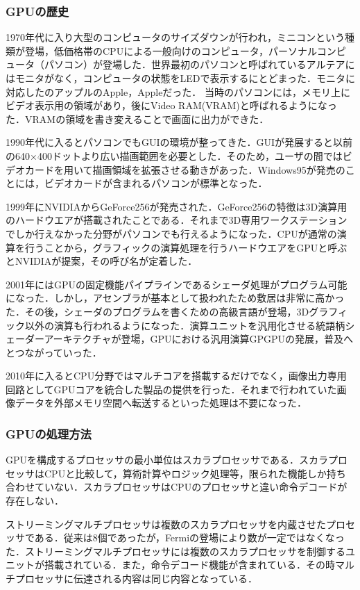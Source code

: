 \documentclass[a4j,12pt]{jsarticle}
\begin{document}
\subsubsection{GPUの歴史}
1970年代に入り大型のコンピュータのサイズダウンが行われ，ミニコンという種類が登場，低価格帯のCPUによる一般向けのコンピュータ，パーソナルコンピュータ（パソコン）が登場した．世界最初のパソコンと呼ばれているアルテアにはモニタがなく，コンピュータの状態をLEDで表示するにとどまった．モニタに対応したのアップルのApple，Appleだった．
当時のパソコンには，メモリ上にビデオ表示用の領域があり，後にVideo RAM(VRAM)と呼ばれるようになった．VRAMの領域を書き変えることで画面に出力ができた．

1990年代に入るとパソコンでもGUIの環境が整ってきた．GUIが発展すると以前の640×400ドットより広い描画範囲を必要とした．そのため，ユーザの間ではビデオカードを用いて描画領域を拡張させる動きがあった．Windows95が発売のことには，ビデオカードが含まれるパソコンが標準となった．

1999年にNVIDIAからGeForce256が発売された．GeForce256の特徴は3D演算用のハードウエアが搭載されたことである．それまで3D専用ワークステーションでしか行えなかった分野がパソコンでも行えるようになった．CPUが通常の演算を行うことから，グラフィックの演算処理を行うハードウエアをGPUと呼ぶとNVIDIAが提案，その呼び名が定着した．

2001年にはGPUの固定機能パイプラインであるシェーダ処理がプログラム可能になった．しかし，アセンブラが基本として扱われたため敷居は非常に高かった．その後，シェーダのプログラムを書くための高級言語が登場，3Dグラフィック以外の演算も行われるようになった．演算ユニットを汎用化させる統語柄シェーダーアーキテクチャが登場，GPUにおける汎用演算GPGPUの発展，普及へとつながっていった．

2010年に入るとCPU分野ではマルチコアを搭載するだけでなく，画像出力専用回路としてGPUコアを統合した製品の提供を行った．それまで行われていた画像データを外部メモリ空間へ転送するといった処理は不要になった．

\subsubsection{GPUの処理方法}
GPUを構成するプロセッサの最小単位はスカラプロセッサである．スカラプロセッサはCPUと比較して，算術計算やロジック処理等，限られた機能しか持ち合わせていない．スカラプロセッサはCPUのプロセッサと違い命令デコードが存在しない．

ストリーミングマルチプロセッサは複数のスカラプロセッサを内蔵させたプロセッサである．従来は8個であったが，Fermiの登場により数が一定ではなくなった．ストリーミングマルチプロセッサには複数のスカラプロセッサを制御するユニットが搭載されている．また，命令デコード機能が含まれている．その時マルチプロセッサに伝達される内容は同じ内容となっている．
\end{document}
